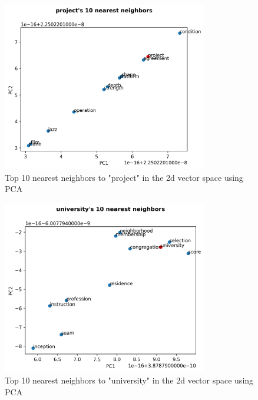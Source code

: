 \documentclass[12pt,letterpaper]{article}
\begin{document}
\begin{figure}[H]
\begin{center}
  \includegraphics[width=0.8\textwidth]{../graphs/project_neighbors.png}
\end{center}
\caption{Top 10 nearest neighbors to "project" in the 2d vector space using PCA}
\end{figure}

\begin{figure}[H]
\begin{center}
  \includegraphics[width=0.8\textwidth]{../graphs/university_neighbors.png}
\end{center}
\caption{Top 10 nearest neighbors to "university" in the 2d vector space using PCA}
\end{figure}
\end{document}
